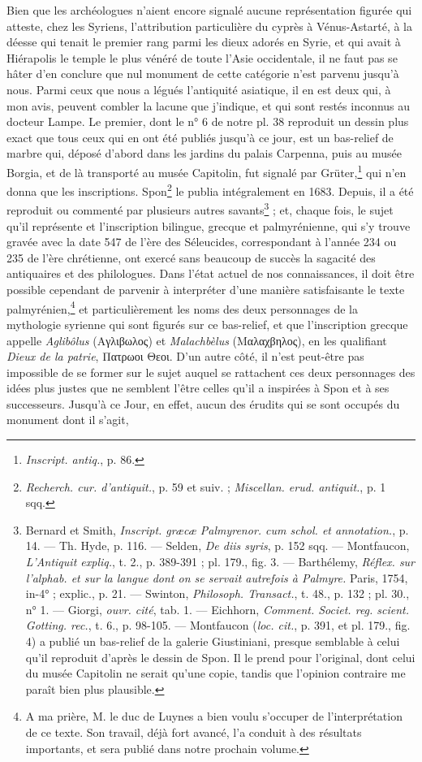 \documentclass[a4paper, 11pt, oneside, polutonikogreek, french]{article}
\begin{document}
Bien que les archéologues n'aient encore signalé aucune représentation figurée qui atteste, chez les Syriens, l'attribution particulière du cyprès à Vénus-Astarté, à la déesse qui tenait le premier rang parmi les dieux adorés en Syrie, et qui avait à Hiérapolis le temple le plus vénéré de toute l'Asie occidentale, il ne faut pas se hâter d'en conclure que nul monument de cette catégorie n'est parvenu jusqu'à nous. Parmi ceux que nous a légués l'antiquité asiatique, il en est deux qui, à mon avis, peuvent combler la lacune que j'indique, et qui sont restés inconnus au docteur Lampe. Le premier, dont le n° 6 de notre pl. 38 reproduit un dessin plus exact que tous ceux qui en ont été publiés jusqu'à ce jour, est un bas-relief de marbre qui, déposé d'abord dans les jardins du palais Carpenna, puis au musée Borgia, et de là transporté au musée Capitolin, fut signalé par Grüter,\footnote{\emph{Inscript. antiq.}, p. 86.} qui n'en donna que les inscriptions. Spon\footnote{\emph{Recherch. cur. d'antiquit.}, p. 59 et suiv. ; \emph{Miscellan. erud. antiquit.}, p. 1 sqq.} le publia intégralement en 1683. Depuis, il a été reproduit ou commenté par plusieurs autres savants\footnote{Bernard et Smith, \emph{Inscript. græcæ Palmyrenor. cum schol. et annotation.}, p. 14. --- Th. Hyde, p. 116. --- Selden, \emph{De diis syris}, p. 152 sqq. --- Montfaucon, \emph{L'Antiquit expliq.}, t. 2., p. 389-391 ; pl. 179., fig. 3. --- Barthélemy, \emph{Réflex. sur l'alphab. et sur la langue dont on se servait autrefois à Palmyre.} Paris, 1754, in-4° ; explic., p. 21. --- Swinton, \emph{Philosoph. Transact.}, t. 48., p. 132 ; pl. 30., n° 1. --- Giorgi, \emph{ouvr. cité}, tab. 1. --- Eichhorn, \emph{Comment. Societ. reg. scient. Gotting. rec.}, t. 6., p. 98-105. --- Montfaucon (\emph{loc. cit.}, p. 391, et pl. 179., fig. 4) a publié un bas-relief de la galerie Giustiniani, presque semblable à celui qu'il reproduit d'après le dessin de Spon. Il le prend pour l'original, dont celui du musée Capitolin ne serait qu'une copie, tandis que l'opinion contraire me paraît bien plus plausible.} ; et, chaque fois, le sujet qu'il représente et l'inscription bilingue, grecque et palmyrénienne, qui s'y trouve gravée avec la date 547 de l'ère des Séleucides, correspondant à l'année 234 ou 235 de l'ère chrétienne, ont exercé sans beaucoup de succès la sagacité des antiquaires et des philologues. Dans l'état actuel de nos connaissances, il doit être possible cependant de parvenir à interpréter d'une manière satisfaisante le texte palmyrénien,\footnote{A ma prière, M. le duc de Luynes a bien voulu s'occuper de l'interprétation de ce texte. Son travail, déjà fort avancé, l'a conduit à des résultats importants, et sera publié dans notre prochain volume.} et particulièrement les noms des deux personnages de la mythologie syrienne qui sont figurés sur ce bas-relief, et que l'inscription grecque appelle \emph{Aglibôlus} (Αγλιβωλος) et \emph{Malachbèlus} (Μαλαχβηλος), en les qualifiant \emph{Dieux de la patrie}, Πατρωοι Θεοι. D'un autre côté, il n'est peut-être pas impossible de se former sur le sujet auquel se rattachent ces deux personnages des idées plus justes que ne semblent l'être celles qu'il a inspirées à Spon et à ses successeurs. Jusqu'à ce Jour, en effet, aucun des érudits qui se sont occupés du monument dont il s'agit, 
\end{document}
